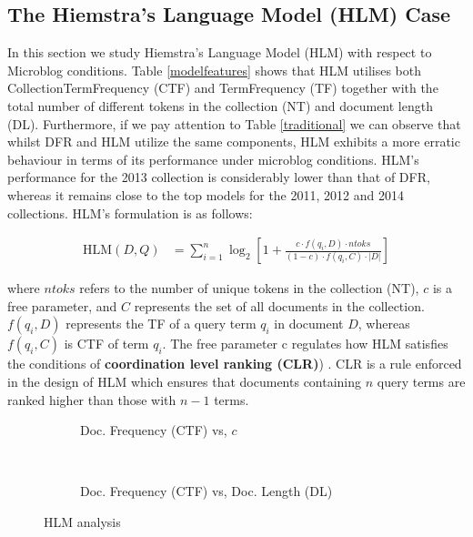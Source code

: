 
\subsection{The Hiemstra's Language Model (HLM) Case}
In this section we study Hiemstra's Language Model (HLM) with respect to Microblog conditions. Table \ref{modelfeatures} shows that HLM utilises both CollectionTermFrequency (CTF) and TermFrequency (TF) together with the total number of different tokens in the collection (NT) and document length (DL). Furthermore, if we pay attention to Table \ref{traditional} we can observe that whilst DFR and HLM utilize the same components, HLM exhibits a more erratic behaviour in terms of its performance under microblog conditions. HLM's performance for the 2013 collection is considerably lower than that of DFR, whereas it remains close to the top models for the 2011, 2012 and 2014 collections. HLM's formulation is as follows: 

\begin{small}
\begin{align}
\label{hlmformula}
    \text{HLM}(D,Q) &= \sum_{i=1}^{n} \log_2 \left[ 1 + \frac{c \cdot f(q_i, D) \cdot ntoks }{ (1-c) \cdot f(q_i, C) \cdot |D|} \right]
\end{align}
\end{small}

where $ntoks$ refers to the number of unique tokens in the collection (NT), $c$ is a free parameter, and $C$ represents the set of all documents in the collection. $f(q_i, D)$ represents the TF of a query term $q_i$ in document $D$, whereas $f(q_i, C)$ is CTF of term $q_i$. The free parameter c regulates how HLM satisfies the conditions of \textbf{coordination level ranking (CLR)}) \cite{hiemstra2000relating}. CLR is a rule enforced in the design of HLM which ensures that documents containing $n$ query terms are ranked higher than those with $n-1$ terms.

\begin{figure}[]
        
       \begin{subfigure}[b]{0.5\textwidth}
        \centering
        \caption{Doc. Frequency (CTF) vs, $c$}
         
      \end{subfigure}      
      ~
       \begin{subfigure}[b]{0.5\textwidth}
        \centering
        \caption{Doc. Frequency (CTF) vs, Doc. Length (DL)}
         
		\label{hlm-ctf-dl}
      \end{subfigure} 
    \caption{HLM analysis}
		\label{hlmanalysis}
\end{figure}


